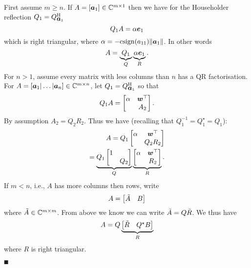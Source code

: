 First assume $m \ensuremath{\geq} n$. If $A = [\bm{{\mbox{\boldmath$a$\unboldmath}}}_1] \in {\mathbb C}^{m \times 1}$ then we have for the Householder reflection $Q_1 = Q_{\bm{{\mbox{\boldmath$a$\unboldmath}}}_1}^{\rm H}$
\[
Q_1 A = \alpha \bm{{\mbox{\boldmath$e$\unboldmath}}}_1
\]
which is right triangular, where $\alpha = -{\rm csign}(a_{11}) \|\bm{{\mbox{\boldmath$a$\unboldmath}}}_1\|$.  In other words 
\[
A = \underbrace{Q_1}_Q \underbrace{\alpha \bm{{\mbox{\boldmath$e$\unboldmath}}}_1}_R.
\]
For $n > 1$, assume every matrix with less columns than $n$ has a QR factorisation. For $A = [\bm{{\mbox{\boldmath$a$\unboldmath}}}_1|\ldots|\bm{{\mbox{\boldmath$a$\unboldmath}}}_n] \in {\mathbb C}^{m \times n}$, let $Q_1 = Q_{\bm{{\mbox{\boldmath$a$\unboldmath}}}_1}^{\rm H}$ so that
\[
Q_1 A =  \begin{bmatrix} \alpha & \bm{{\mbox{\boldmath$w$\unboldmath}}}^\top \\ & A_2 \end{bmatrix}.
\]
By assumption $A_2 = Q_2 R_2$. Thus we have (recalling that $Q_1^{-1} = Q_1^\ensuremath{\star} = Q_1$):
\begin{align*}
A = Q_1 \begin{bmatrix} \alpha & \bm{{\mbox{\boldmath$w$\unboldmath}}}^\top \\ & Q_2 R_2 \end{bmatrix} \\
=\underbrace{Q_1 \begin{bmatrix} 1 \\ & Q_2 \end{bmatrix}}_Q  \underbrace{\begin{bmatrix} \alpha & \bm{{\mbox{\boldmath$w$\unboldmath}}}^\top \\ &  R_2 \end{bmatrix}}_R.
\end{align*}
If $m < n$, i.e., $A$ has more columns then rows, write 
\[
A = \begin{bmatrix} \tilde A & B \end{bmatrix}
\]
where $\tilde A \in {\mathbb C}^{m \times m}$. From above we know we can write $\tilde A = Q \tilde R$. We thus have
\[
A = Q \underbrace{\begin{bmatrix} \tilde R & Q^\star B \end{bmatrix}}_R
\]
where $R$ is right triangular.

\ensuremath{\QED}

